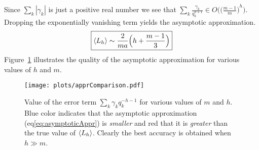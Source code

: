 Since $\sum_k|\gamma_k|$ is just a positive real number we see that $\sum_k \frac{\gamma_k}{q_k^{h+1}} \in O\Big({\big(\frac{m-1}{m}\big)}^h\Big)$. Dropping the exponentially vanishing term yields the asymptotic approximation.
\begin{align}
	\boxed{\left\langle L_h \right\rangle
		\sim \frac{2}{ma}\Big(h + \frac{m-1}{3}\Big)
	}\label{eq:asymptoticAppr}
\end{align}
Figure~\ref{fig:apprComparison} illustrates the quality of the asymptotic approximation for various values of $h$ and $m$.
\begin{figure}[h]
    \texttt{[image: plots/apprComparison.pdf]}
	\caption{Value of the error term $\sum_k \gamma_k q_k^{-h-1}$ for various values of $m$ and $h$. Blue color indicates that the asymptotic approximation (eq\ref{eq:asymptoticAppr}) is \emph{smaller} and red that it is \emph{greater} than the true value of $\left\langle L_h \right\rangle$. Clearly the best accuracy is obtained when $h \gg m$.}\label{fig:apprComparison}
\end{figure}
